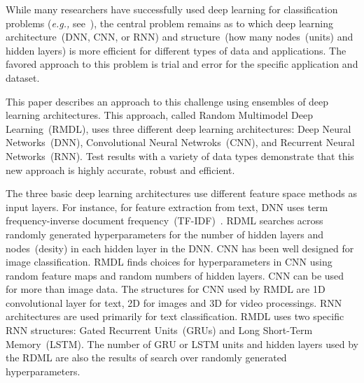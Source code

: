 \documentclass[sigconf, final]{acmart}
\begin{document}
While many researchers have successfully used deep learning for  classification problems (\textit{e.g.,} see~\cite{kowsari2017HDLTex,lecun2015deep,lee2009convolutional,chung2014empirical,turan2017deep}), %
the central problem remains as to which deep learning architecture~(DNN, CNN, or RNN) and structure~(how many nodes~(units) and hidden layers) is more efficient for different types of data and applications. The favored approach to this problem is 
trial and error for the specific application and dataset.

This paper describes an approach to this challenge using ensembles of deep learning architectures. This approach, called Random Multimodel Deep Learning~(RMDL), %
uses three different deep learning architectures: Deep Neural Networks~(DNN), Convolutional Neural Netwroks~(CNN), and Recurrent Neural Networks~(RNN). Test results with a variety of data types demonstrate that this new approach is highly accurate, robust and efficient.

The three basic deep learning architectures use different feature space methods as input layers. %
For instance, for feature extraction from text, DNN %
uses term frequency-inverse document frequency~(TF-IDF)~\cite{robertson2004understanding}. RDML searches across randomly generated hyperparameters for the number of hidden layers and nodes~(desity) in each hidden layer in the DNN.
CNN has been well designed for image classification. RMDL finds choices for hyperparameters in CNN using random feature maps and random numbers of hidden layers. CNN can be used for more than image data. The structures for CNN used by RMDL are 1D convolutional layer for text, 2D for images and 3D for video processings.
RNN architectures are used primarily for text classification. RMDL uses two specific RNN structures: Gated Recurrent Units~(GRUs) and Long Short-Term Memory~(LSTM). The number of GRU or LSTM units and hidden layers used by the RDML are also the results of search over randomly generated hyperparameters.
\end{document}
